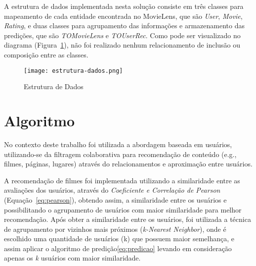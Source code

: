 \documentclass[12pt]{article}
\begin{document}
A estrutura de dados implementada nesta solução consiste em três classes para mapeamento de cada entidade encontrada no MovieLens, que são \textit{User}, \textit{Movie}, \textit{Rating}, e duas classes para agrupamento das informações e armazenamento das predições, que são \textit{TOMovieLens} e \textit{TOUserRec}. Como pode ser visualizado no diagrama (Figura~\ref{fig:estrutura-dados}), não foi realizado nenhum relacionamento de inclusão ou composição entre as classes.

\begin{figure}[ht]
\centering
\texttt{[image: estrutura-dados.png]}
\caption{Estrutura de Dados}
\label{fig:estrutura-dados}
\end{figure}

\section{Algoritmo}\label{sec:algoritmos}
No contexto deste trabalho foi utilizada a abordagem baseada em usuários, utilizando-se da filtragem colaborativa para recomendação de conteúdo (e.g., filmes, páginas, lugares) através do relacionamentos e aproximação entre usuários.
\par
A recomendação de filmes foi implementada utilizando a similaridade entre as avaliações dos usuários, através do \textit{Coeficiente e Correlação de Pearson} (Equação~\ref{eq:pearson}), obtendo assim, a similaridade entre os usuários e possibilitando o agrupamento de usuários com maior similaridade para melhor recomendação.
Após obter a similaridade entre os usuários, foi utilizada a técnica de agrupamento por vizinhos mais próximos (\textit{k-Nearest Neighbor}), onde é escolhido uma quantidade de usuários (k) que possuem maior semelhança, e assim aplicar o algoritmo de predição\ref{eq:predicao} levando em consideração apenas os \textit{k} usuários com maior similaridade.
\end{document}
